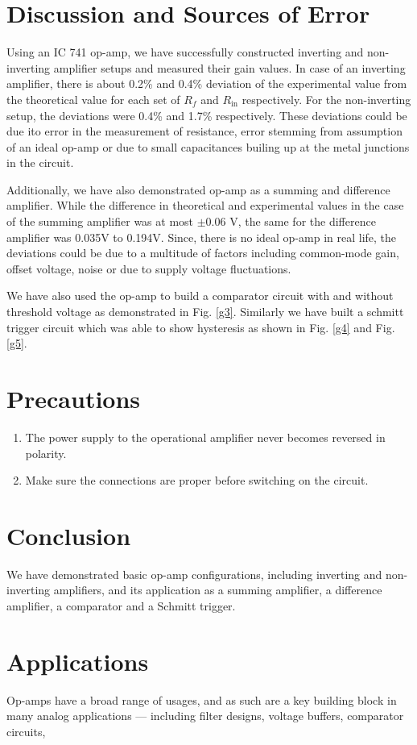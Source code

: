 \section{Discussion and Sources of Error}
Using an IC 741 op-amp, we have successfully constructed inverting and non-inverting amplifier setups and measured their gain values. In case of an inverting amplifier, there is about 0.2\% and 0.4\% deviation of the experimental value from the theoretical value for each set of $R_f$ and $R_\text{in}$ respectively. For the non-inverting setup, the deviations were 0.4\% and 1.7\% respectively. These deviations could be due ito error in the measurement of resistance, error stemming from assumption of an ideal op-amp or due to small capacitances builing up at the metal junctions in the circuit.

Additionally, we have also demonstrated op-amp as a summing and difference amplifier. While the difference in theoretical and experimental values in the case of the summing amplifier was at most $\pm$0.06 V, the same for the difference amplifier was 0.035V to 0.194V. Since, there is no ideal op-amp in real life, the deviations could be due to a multitude of factors including common-mode gain, offset voltage, noise or due to supply voltage fluctuations. 

We have also used the op-amp to build a comparator circuit with and without threshold voltage as demonstrated in Fig. \ref{g3}. Similarly we have built a schmitt trigger circuit which was able to show hysteresis as shown in Fig. \ref{g4} and Fig. \ref{g5}. 

\section{Precautions}

\begin{enumerate}
    \item The power supply to the operational amplifier never becomes reversed in polarity.
    \item Make sure the connections are proper before switching on the circuit.
\end{enumerate}

\section{Conclusion}
We have demonstrated basic op-amp configurations, including inverting and non-inverting amplifiers, and its application as a summing amplifier, a difference amplifier, a comparator and a Schmitt trigger.

\section{Applications}
Op-amps have a broad range of usages, and as such are a key building block in many analog applications — including filter designs, voltage buffers, comparator circuits,